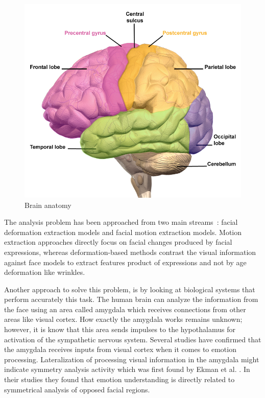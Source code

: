\begin{figure}[ht]
    \centering
    \includegraphics[scale=1.0]{images/Figure6Brain.png}
    \caption{Brain anatomy}
    \label{fig:Brain anatomy}
\end{figure}

The analysis problem has been approached from two main streams~\cite{Fasel2003}: facial deformation extraction models and facial motion extraction models. Motion extraction approaches directly focus on facial changes produced by facial expressions, whereas deformation-based methods contrast the visual information against face models to extract features product of expressions and not by age deformation like wrinkles.

Another approach to solve this problem, is by looking at biological systems that perform accurately this task. The human brain can analyze the information from the face using an area called amygdala which receives connections from other areas like visual cortex. How exactly the amygdala works remains unknown; however, it is know that this area sends impulses to the hypothalamus for activation of the sympathetic nervous system. Several studies have confirmed that the amygdala receives inputs from visual cortex when it comes to emotion processing. Lateralization of processing visual information in the amygdala might indicate symmetry analysis activity which was first found by Ekman et al. \cite{Hager1979}. In their studies they found that emotion understanding is directly related to symmetrical analysis of opposed facial regions.

